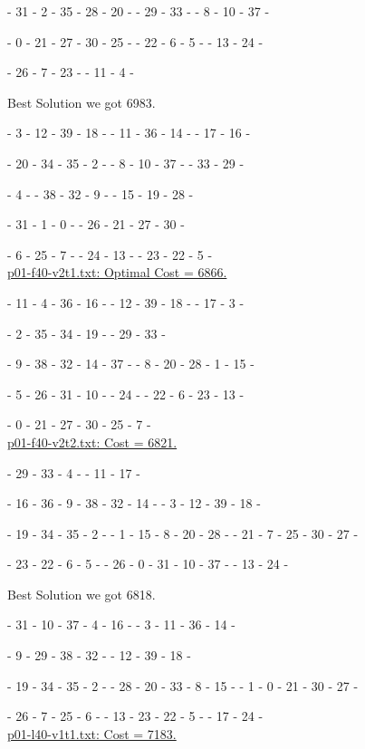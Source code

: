 \tc- 31 - 2 - 35 - 28 - 20 - \tc - 29 - 33 - \tc - 8 - 10 - 37 - \tc 

\te- 0 - 21 - 27 - 30 - 25 - \te - 22 - 6 - 5 - \te - 13 - 24 - \te 

\te- 26 - 7 - 23 - \te - 11 - 4 - \te 

Best Solution we got  6983.

\ta - 3 - 12 - 39 - 18 - \ta - 11 - 36 - 14 - \ta - 17 - 16 - \ta 

\tc - 20 - 34 - 35 - 2 - \tc - 8 - 10 - 37 - \tc - 33 - 29 - \tc 

\tc - 4 - \tc - 38 - 32 - 9 - \tc - 15 - 19 - 28 - \tc 

\te- 31 - 1 - 0 - \te - 26 - 21 - 27 - 30 - \te

\te- 6 - 25 - 7 - \te - 24 - 13 - \te - 23 - 22 - 5 - \te 
\\

\underline{p01-f40-v2t1.txt: Optimal Cost =  6866.}

\ta - 11 - 4 - 36 - 16 - \ta - 12 - 39 - 18 - \ta - 17 - 3 - \ta 

\tc - 2 - 35 - 34 - 19 - \tc - 29 - 33 - \tc

\tc - 9 - 38 - 32 - 14 - 37 - \tc - 8 - 20 - 28 - 1 - 15 - \tc 

\te- 5 - 26 - 31 - 10 - \te - 24 - \te - 22 - 6 - 23 - 13 - \te 

\te- 0 - 21 - 27 - 30 - 25 - 7 - \te 
\\ 

\underline{p01-f40-v2t2.txt: Cost = 6821.}

\ta- 29 - 33 - 4 - \ta - 11 - 17 - \ta 

\ta - 16 - 36 - 9 - 38 - 32 - 14 - \ta - 3 - 12 - 39 - 18 - \ta

\td- 19 - 34 - 35 - 2 - \td - 1 - 15 - 8 - 20 - 28 - \td - 21 - 7 - 25 - 30 - 27 - \td 

\te- 23 - 22 - 6 - 5 - \te - 26 - 0 - 31 - 10 - 37 - \te - 13 - 24 - \te

Best Solution we got  6818.

\ta- 31 - 10 - 37 - 4 - 16 - \ta - 3 - 11 - 36 - 14 - \ta 

\ta- 9 - 29 - 38 - 32 - \ta - 12 - 39 - 18 - \ta 

\td- 19 - 34 - 35 - 2 - \td - 28 - 20 - 33 - 8 - 15 - \td - 1 - 0 - 21 - 30 - 27 - \td 

\te- 26 - 7 - 25 - 6 - \te - 13 - 23 - 22 - 5 - \te - 17 - 24 - \te 
\\

\underline{p01-l40-v1t1.txt: Cost = 7183.}

